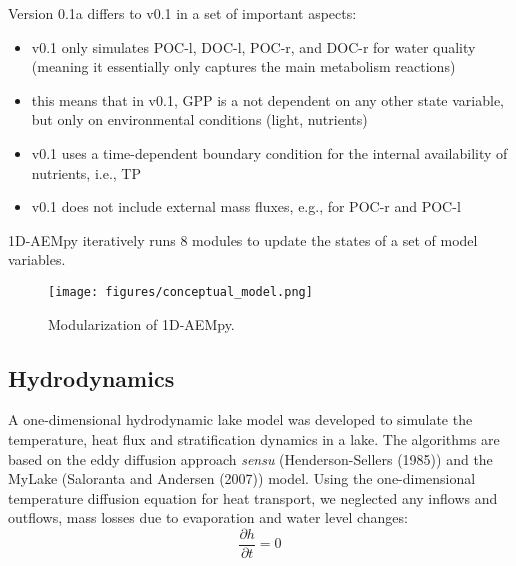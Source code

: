 \documentclass[
  letterpaper,
  DIV=11,
  numbers=noendperiod]{scrartcl}
\providecommand{\tightlist}{%
  \setlength{\itemsep}{0pt}\setlength{\parskip}{0pt}}\usepackage{longtable,booktabs,array}
\begin{document}
\begin{tcolorbox}[enhanced jigsaw, breakable, toprule=.15mm, rightrule=.15mm, bottomtitle=1mm, left=2mm, bottomrule=.15mm, leftrule=.75mm, opacityback=0, toptitle=1mm, arc=.35mm, coltitle=black, colframe=quarto-callout-note-color-frame, title=\textcolor{quarto-callout-note-color}{\faInfo}\hspace{0.5em}{Note}, opacitybacktitle=0.6, titlerule=0mm, colback=white, colbacktitle=quarto-callout-note-color!10!white]

Version 0.1a differs to v0.1 in a set of important aspects:

\begin{itemize}
\tightlist
\item
  v0.1 only simulates POC-l, DOC-l, POC-r, and DOC-r for water quality
  (meaning it essentially only captures the main metabolism reactions)
\item
  this means that in v0.1, GPP is a not dependent on any other state
  variable, but only on environmental conditions (light, nutrients)
\item
  v0.1 uses a time-dependent boundary condition for the internal
  availability of nutrients, i.e., TP
\item
  v0.1 does not include external mass fluxes, e.g., for POC-r and POC-l
\end{itemize}

\end{tcolorbox}

1D-AEMpy iteratively runs 8 modules to update the states of a set of
model variables.

\begin{figure}

{\centering \texttt{[image: figures/conceptual\_model.png]}

}

\caption{\label{fig-best_model}Modularization of 1D-AEMpy.}

\end{figure}

\hypertarget{hydrodynamics}{%
\subsection{Hydrodynamics}\label{hydrodynamics}}

A one-dimensional hydrodynamic lake model was developed to simulate the
temperature, heat flux and stratification dynamics in a lake. The
algorithms are based on the eddy diffusion approach \textit{sensu}
(Henderson-Sellers (1985)) and the MyLake (Saloranta and Andersen
(2007)) model. Using the one-dimensional temperature diffusion equation
for heat transport, we neglected any inflows and outflows, mass losses
due to evaporation and water level changes: \[
    \frac{\partial h}{\partial t}=0
\]
\end{document}

